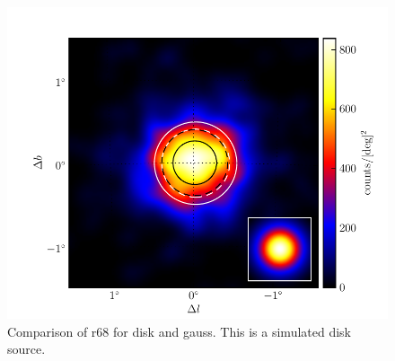 \documentclass[preprint]{aastex}
\begin{document}
  \begin{figure}
    \begin{center}
      \includegraphics{mc_plots/compare_r68.pdf}
    \end{center}
    \caption{Comparison of r68 for disk and gauss. This is a simulated disk source.
    }\label{compare_r68}
  \end{figure}
\end{document}
